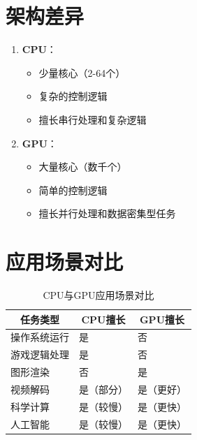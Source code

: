 \documentclass[12pt,UTF8]{ctexbook}
\begin{document}
\section{架构差异}

\begin{enumerate}
    \item \textbf{CPU}：
    \begin{itemize}[leftmargin=2em]
        \item 少量核心（2-64个）
        \item 复杂的控制逻辑
        \item 擅长串行处理和复杂逻辑
    \end{itemize}
    
    \item \textbf{GPU}：
    \begin{itemize}[leftmargin=2em]
        \item 大量核心（数千个）
        \item 简单的控制逻辑
        \item 擅长并行处理和数据密集型任务
    \end{itemize}
\end{enumerate}

\section{应用场景对比}

\begin{table}[H]
    \centering
    \begin{tabularx}{\textwidth}{|p{3cm}|X|X|}
        \hline
        \multicolumn{1}{|c|}{\textbf{任务类型}} & \multicolumn{1}{c|}{\textbf{CPU擅长}} & \multicolumn{1}{c|}{\textbf{GPU擅长}} \\
        \hline
        操作系统运行 & 是 & 否 \\
        \hline
        游戏逻辑处理 & 是 & 否 \\
        \hline
        图形渲染 & 否 & 是 \\
        \hline
        视频解码 & 是（部分） & 是（更好） \\
        \hline
        科学计算 & 是（较慢） & 是（更快） \\
        \hline
        人工智能 & 是（较慢） & 是（更快） \\
        \hline
    \end{tabularx}
    \caption{CPU与GPU应用场景对比}
    \label{tab:cpu_gpu_tasks}
\end{table}
\end{document}
